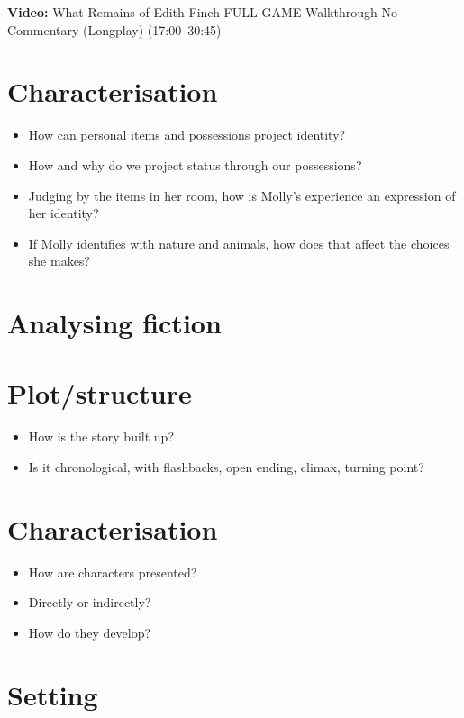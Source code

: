 \documentclass[11pt,a4paper,oneside]{book}
\begin{document}
\par\noindent\textbf{Video:} What Remains of Edith Finch FULL GAME Walkthrough No Commentary (Longplay) (17:00–30:45)\par\medskip

\section*{Characterisation}

\begin{itemize}
\item How can personal items and possessions project identity?
\item How and why do we project status through our possessions?
\item Judging by the items in her room, how is Molly's experience an expression of her identity?
\item If Molly identifies with nature and animals, how does that affect the choices she makes?
\end{itemize}

\section*{Analysing fiction}

\section*{Plot/structure}

\begin{itemize}
\item How is the story built up?
\item Is it chronological, with flashbacks, open ending, climax, turning point?
\end{itemize}

\section*{Characterisation}

\begin{itemize}
\item How are characters presented?
\item Directly or indirectly?
\item How do they develop?
\end{itemize}

\section*{Setting}
\end{document}
